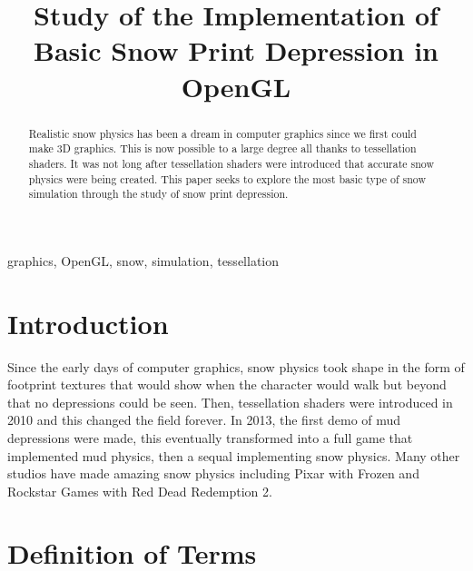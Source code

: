 \documentclass[conference]{IEEEtran}
\begin{document}
\title{Study of the Implementation of Basic Snow Print Depression in OpenGL}

\author{
\and
{}
}

\maketitle

\begin{abstract}
Realistic snow physics has been a dream in computer graphics since we first could make 3D graphics. This is now possible to a large degree all thanks to tessellation shaders. It was not long after tessellation shaders were introduced that accurate snow physics were being created. This paper seeks to explore the most basic type of snow simulation through the study of snow print depression.
\end{abstract}

\begin{IEEEkeywords}
graphics, OpenGL, snow, simulation, tessellation
\end{IEEEkeywords}

\section{Introduction}
Since the early days of computer graphics, snow physics took shape in the form of footprint textures that would show when the character would walk but beyond that no depressions could be seen. Then, tessellation shaders were introduced in 2010 and this changed the field forever. In 2013, the first demo of mud depressions were made, this eventually transformed into a full game that implemented mud physics, then a sequal implementing snow physics. Many other studios have made amazing snow physics including Pixar with Frozen and Rockstar Games with Red Dead Redemption 2.

\section{Definition of Terms}
\end{document}
